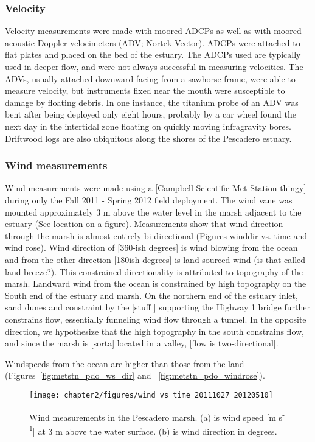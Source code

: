 \subsubsection{Velocity} \label{sssec:velmeas}
Velocity measurements were made with moored ADCPs as well as with moored acoustic Doppler velocimeters (ADV; Nortek Vector). ADCPs were attached to flat plates and placed on the bed of the estuary. The ADCPs used are typically used in deeper flow, and were not always successful in measuring velocities. The ADVs, usually attached downward facing from a sawhorse frame, were able to measure velocity, but instruments fixed near the mouth were susceptible to damage by floating debris. In one instance, the titanium probe of an ADV was bent after being deployed only eight hours, probably by a car wheel found the next day in the intertidal zone floating on quickly moving infragravity bores. Driftwood logs are also ubiquitous along the shores of the Pescadero estuary.  


\subsubsection{Wind measurements} \label{sssec:windmeas}
Wind measurements were made using a [Campbell Scientific Met Station
thingy] during only the Fall 2011 - Spring 2012 field deployment. The wind
vane was mounted approximately 3 m above the water level in the marsh
adjacent to the estuary (See location on a figure).  Measurements show
that wind direction through the marsh is almost entirely bi-directional
(Figures winddir vs. time and wind rose). Wind direction of [360-ish
degrees] is wind blowing from the ocean and from the other direction
[180ish degrees] is land-sourced wind (is that called land breeze?).
This constrained directionality is attributed to topography of the
marsh.  Landward wind from the ocean is constrained by high topography
on the South end of the estuary and marsh. On the northern end of the
estuary inlet, sand dunes and constraint by the [stuff ] supporting the
Highway 1 bridge further constrains flow, essentially funneling wind
flow through a tunnel.  In the opposite direction, we hypothesize that
the high topography in the south constrains flow, and since the marsh is
[sorta] located in a valley, [flow is two-directional].

Windspeeds from the ocean are higher than those from the land (Figures~\ref{fig:metstn_pdo_ws_dir} and~
\ref{fig:metstn_pdo_windrose}).

\begin{figure} \centering
	\texttt{[image: chapter2/figures/wind\_vs\_time\_20111027\_20120510]} \caption{Wind measurements in the Pescadero marsh. (a) is wind speed [m s\textsuperscript{-1}] at 3 m above the water surface. (b) is wind direction in degrees.}
\label{fig:metstn_pdo_ws_wdir} 
\end{figure}

